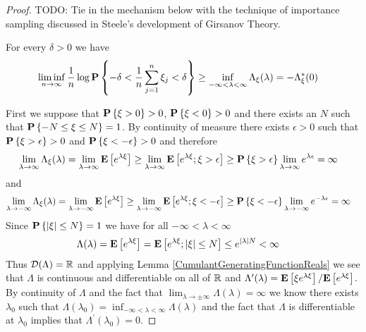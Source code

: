 \begin{proof}
TODO: Tie in the mechanism below with the technique of importance sampling discussed in Steele's development of Girsanov Theory.
\begin{clm}For every $\delta > 0$ we have
\begin{align*}
\liminf_{n \to \infty} \frac{1}{n} \log \textbf{P}\left \{-\delta < \frac{1}{n} \sum_{j=1}^n \xi_j < \delta \right \} &\geq \inf_{-\infty < \lambda < \infty} \Lambda_\xi(\lambda) = -\Lambda_\xi^*(0)
\end{align*}
\end{clm}
First we suppose that $\textbf{P}\left \{\xi > 0 \right \}>0$, $\textbf{P}\left \{\xi < 0 \right \}>0$ and there exists an $N$ such that $\textbf{P}\left \{-N \leq \xi \leq N \right \} =1$.  By continuity of measure there exists $\epsilon > 0$ such that $\textbf{P}\left \{\xi > \epsilon \right \}>0$ and $\textbf{P}\left \{\xi < -\epsilon \right \}>0$ and therefore
\begin{align*}
\lim_{\lambda \to \infty} \Lambda_\xi(\lambda) &= \lim_{\lambda \to \infty} \textbf{E}\left[e^{\lambda \xi}\right] \geq \lim_{\lambda \to \infty} \textbf{E}\left[e^{\lambda \xi}; \xi > \epsilon\right] \geq \textbf{P}\left \{\xi > \epsilon \right \} \lim_{\lambda \to \infty} e^{\lambda \epsilon} = \infty
\end{align*}
and
\begin{align*}
\lim_{\lambda \to -\infty} \Lambda_\xi(\lambda) &= \lim_{\lambda \to -\infty} \textbf{E}\left[e^{\lambda \xi}\right] \geq \lim_{\lambda \to -\infty} \textbf{E}\left[e^{\lambda \xi}; \xi < -\epsilon\right] \geq \textbf{P}\left \{\xi <  -\epsilon \right \} \lim_{\lambda \to -\infty} e^{-\lambda \epsilon} = \infty
\end{align*}
Since $\textbf{P}\left \{\left \vert \xi \right \vert \leq N \right \}=1$ we have for all $-\infty < \lambda < \infty$
\begin{align*}
\Lambda(\lambda) &= \textbf{E}\left[e^{\lambda \xi}\right] = \textbf{E}\left[e^{\lambda \xi}; \left \vert \xi \right \vert \leq N\right] \leq e^{\left \vert \lambda \right \vert N} < \infty
\end{align*}
Thus $\mathcal{D}(\Lambda) = \mathbb{R}$ and applying Lemma \ref{CumulantGeneratingFunctionReals} we see that $\Lambda$ is continuous and differentiable on all of $\mathbb{R}$ and 
$\Lambda^\prime(\lambda) = \textbf{E}\left[\xi e^{\lambda \xi}\right]/\textbf{E}\left[e^{\lambda \xi}\right]$.  By continuity of $\Lambda$ and the fact that $\lim_{\lambda \to \pm \infty} \Lambda(\lambda) = \infty$ we know there exists $\lambda_0$ such that $\Lambda(\lambda_0) = \inf_{-\infty < \lambda < \infty} \Lambda(\lambda)$ and the fact that $\Lambda$ is differentiable at $\lambda_0$ implies that $\Lambda^\prime(\lambda_0) = 0$.


\end{proof}
